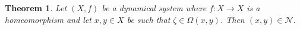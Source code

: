 \documentclass[10pt,a4paper]{article}
\theoremstyle{definition}
\theoremstyle{remark}
\theoremstyle{plain}
\newtheorem{thm}[defi]{Theorem}
\begin{document}




\begin{thm}\label{zetaN}
    Let $(X,f)$ be a dynamical system where $f:X\longrightarrow X$ is a homeomorphism and let $x,y\in X$ be such that  $\zeta\in\Omega(x,y)$. Then $(x,y)\in\mathcal{N}$.
\end{thm}
\end{document}
